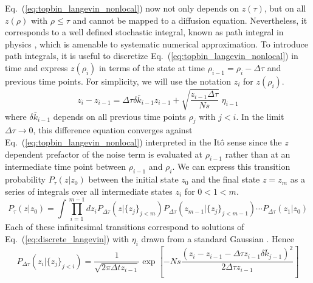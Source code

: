 \documentclass[rmp,preprint]{revtex4}
\newcommand{\EQ}[1]{Eq.~(\ref{eq:#1})}
\newcommand{\xz}{z}
\newcommand{\dk}{\delta \bar{k}}
\newcommand{\tx}[1]{\xz_{#1}}
\begin{document}
\EQ{topbin_langevin_nonlocal} now not only depends on $\xz(\tau)$, but on all $\xz(\rho)$ with $\rho\leq \tau$ and cannot be mapped to a diffusion equation. Nevertheless, it corresponds to a well defined stochastic integral, known as path integral in physics \cite{Feynman:1965}, which is amenable to systematic numerical approximation. To introduce path integrals, it is useful to discretize \EQ{topbin_langevin_nonlocal} in time and express $\xz(\rho_i)$ in terms of the state at time $\rho_{i-1}=\rho_i-\Delta \tau$ and previous time points. For simplicity, we will use the notation $\tx{i}$ for $\xz(\rho_i)$.
\begin{equation}
\label{eq:discrete_langevin}
\tx{i}-\tx{i-1} = \Delta \tau \dk_{i-1} \tx{i-1}+ \sqrt{\frac{\tx{i-1}\Delta \tau}{Ns}}\; \eta_{i-1}
\end{equation}
where $\dk_{i-1}$ depends on all previous time points $\rho_j$ with $j<i$.
In the limit $\Delta \tau\to 0$, this difference equation converges against \EQ{topbin_langevin_nonlocal} interpreted in the It\^o sense since the $\xz$ dependent prefactor of the noise term is evaluated at $\rho_{i-1}$ rather than at an intermediate time point between $\rho_{i-1}$ and $\rho_i$. 
We can express this transition probability  $P_{\tau}(\xz|\tx{0})$ between the initial state $\tx{0}$ and the final state $\xz=\tx{m}$ as a series of integrals over all intermediate states $\tx{i}$ for $0<1<m$. 
\begin{equation}
P_\tau(\xz |\tx{0}) = \int \prod_{i=1}^{m-1} d\tx{i} P_{\Delta \tau}(\xz| \{\tx{j}\}_{j<m}) P_{\Delta \tau}(\tx{m-1}| \{\tx{j}\}_{j<m-1})\cdots  P_{\Delta \tau}(\tx{1}| \tx{0})
\end{equation}
Each of these infinitesimal transitions correspond to solutions of \EQ{discrete_langevin} with $\eta_{i}$ drawn from a standard Gaussian \citep{Lau:2007p45316}. 
Hence 
\begin{equation}
P_{\Delta \tau}(\tx{i}| \{\tx{j}\}_{j<i}) = \frac{1}{\sqrt{2\pi \Delta t \tx{i-1}}} \exp\left[-Ns\frac{\left(\tx{i}-\tx{i-1} - \Delta \tau \tx{i-1}\dk_{j-1}\right)^2}{2\Delta \tau \tx{i-1}} \right]
\end{equation}
\end{document}
